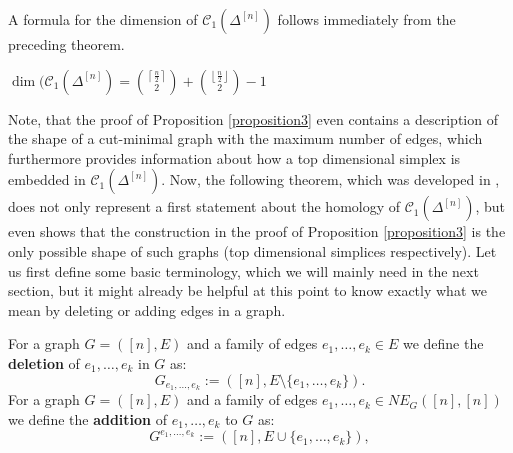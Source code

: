 A formula for the dimension of \(\mathcal{C}_1(\Delta^{[n]})\) follows immediately from the preceding theorem.

\begin{cor}
\(\dim(\mathcal{C}_1(\Delta^{[n]})=\binom{\left\lceil\frac{n}{2}\right\rceil}{2}+\binom{\left\lfloor\frac{n}{2}\right\rfloor}{2}-1\)
\end{cor}

Note, that the proof of Proposition \ref{proposition3} even contains a description of the shape of a cut-minimal graph with the maximum number of edges, which furthermore provides information about how a top dimensional simplex is embedded in \(\mathcal{C}_1(\Delta^{[n]})\). Now, the following theorem, which was developed in \cite{10}, does not only represent a first statement about the homology of \(\mathcal{C}_1(\Delta^{[n]})\), but even shows that the construction in the proof of Proposition \ref{proposition3} is the only possible shape of such graphs (top dimensional simplices respectively). Let us first define some basic terminology, which we will mainly need in the next section, but it might already be helpful at this point to know exactly what we mean by deleting or adding edges in a graph.

\begin{defi}
For a graph \(G=([n],E)\) and a family of edges \(e_1,\ldots,e_k\in E\) we define the \textbf{deletion} of \(e_1,\ldots,e_k\) in \(G\) as:
\[
G_{e_1,\ldots,e_k}:=([n],E\setminus\{e_1,\ldots,e_k\}).
\]
For a graph \(G=([n],E)\) and a family of edges \(e_1,\ldots,e_k\in NE_G([n],[n])\) we define the \textbf{addition} of \(e_1,\ldots,e_k\) to \(G\) as:
\[
G^{e_1,\ldots,e_k}:=([n],E\cup\{e_1,\ldots,e_k\}),
\]
\end{defi}

